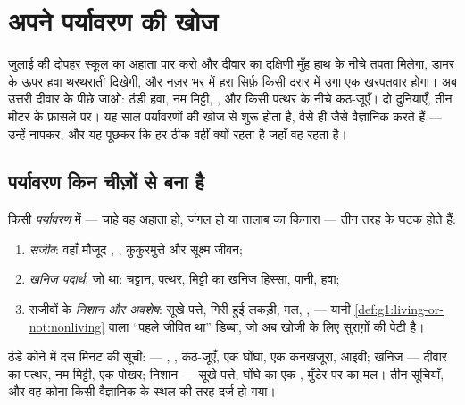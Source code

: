 \chapter{अपने पर्यावरण की खोज}\label{ch:g6:exploring-our-environment}

जुलाई की दोपहर स्कूल का अहाता पार करो और दीवार का दक्षिणी मुँह हाथ के
नीचे तपता मिलेगा, डामर के ऊपर हवा थरथराती दिखेगी, और नज़र भर में हरा
सिर्फ़ किसी दरार में उगा एक खरपतवार होगा। अब उत्तरी दीवार के पीछे जाओ:
ठंडी हवा, नम मिट्टी, , और किसी पत्थर के नीचे कठ-जूएँ। दो दुनियाएँ,
तीन मीटर के फ़ासले पर। यह साल पर्यावरणों की खोज से शुरू होता है, वैसे
ही जैसे वैज्ञानिक करते हैं --- उन्हें नापकर, और यह पूछकर कि हर  ठीक
वहीं क्यों रहता है जहाँ वह रहता है।

\section{पर्यावरण किन चीज़ों से बना है}

\begin{definition}\label{def:g6:exploring-our-environment:components}
किसी \emph{पर्यावरण} में --- चाहे वह अहाता हो, जंगल हो
या तालाब का किनारा --- तीन तरह के घटक होते हैं:
\begin{enumerate}
  \item \emph{सजीव}: वहाँ मौजूद , , कुकुरमुत्ते
        और सूक्ष्म जीवन;
  \item \emph{खनिज पदार्थ}, जो  था:
        चट्टान, पत्थर, मिट्टी का खनिज हिस्सा, पानी, हवा;
  \item सजीवों के \emph{निशान और अवशेष}: सूखे पत्ते, गिरी हुई लकड़ी,
        मल, ,  --- यानी
        \cref{def:g1:living-or-not:nonliving} वाला ``पहले जीवित था''
        डिब्बा, जो अब खोजी के लिए सुराग़ों की पेटी है।
\end{enumerate}
\end{definition}

\begin{example}[उत्तरी दीवार के पीछे की सूची]\label{ex:g6:exploring-our-environment:inventory}
ठंडे कोने में दस मिनट की सूची:  --- , , कठ-जूएँ, एक घोंघा,
एक कनखजूरा, आइवी; खनिज --- दीवार का पत्थर, नम मिट्टी, एक पोखर; निशान
--- सूखे पत्ते, घोंघे का एक , मुँडेर पर  का मल। तीन सूचियाँ,
और वह कोना किसी वैज्ञानिक के स्थल की तरह दर्ज हो गया।
\end{example}

